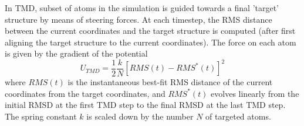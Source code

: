 In TMD, subset of atoms in the simulation is guided towards a 
final 'target' structure by means of steering forces.  At each timestep, 
the RMS distance between
the current coordinates and the target structure is computed (after
first aligning the target structure to the current coordinates).
The force on each atom is given by the gradient of the potential
\begin{equation}
U_{TMD} = \frac{1}{2} \frac{k}{N} \left[ RMS(t) - RMS^*(t) \right]^2
\label{eq:tmdpotential}
\end{equation}
where $RMS(t)$ is the instantaneous best-fit RMS distance of the current
coordinates from the target coordinates, and $RMS^*(t)$ evolves linearly
from the initial RMSD at the first TMD step to the final RMSD at the last 
TMD step.  The spring constant $k$ is scaled down by the number $N$ of targeted
atoms.  

